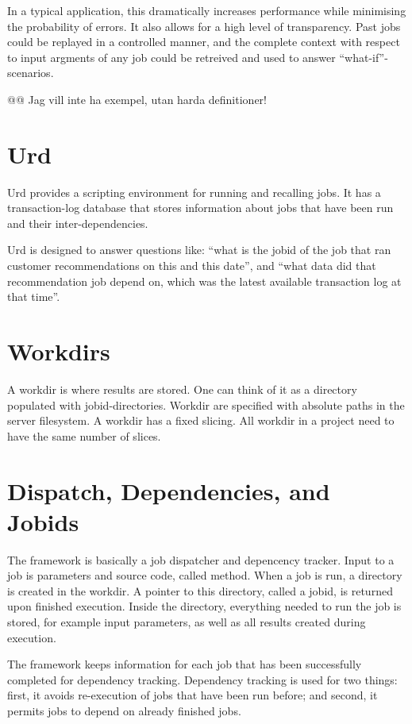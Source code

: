 In a typical application, this dramatically increases performance
while minimising the probability of errors.  It also allows for a high
level of transparency.  Past jobs could be replayed in a controlled
manner, and the complete context with respect to input argments of any
job could be retreived and used to answer ``what-if''-scenarios.

@@ Jag vill inte ha exempel, utan harda definitioner!



\section{Urd}

Urd provides a scripting environment for running and recalling jobs.
It has a transaction-log database that stores information about jobs
that have been run and their inter-dependencies.

Urd is designed to answer questions like: ``what is the jobid of the
job that ran customer recommendations on this and this date'', and
``what data did that recommendation job depend on, which was the
latest available transaction log at that time''.




\section{Workdirs}

A workdir is where results are stored.  One can think of it as a
directory populated with jobid-directories.  Workdir are specified
with absolute paths in the server filesystem.  A workdir has a fixed
slicing.  All workdir in a project need to have the same number of
slices.



\section{Dispatch, Dependencies, and Jobids}

The framework is basically a job dispatcher and depencency tracker.
Input to a job is parameters and source code, called method.  When a
job is run, a directory is created in the workdir.  A pointer to this
directory, called a jobid, is returned upon finished execution.
Inside the directory, everything needed to run the job is stored, for
example input parameters, as well as all results created during
execution.

The framework keeps information for each job that has been
successfully completed for dependency tracking.  Dependency tracking
is used for two things: first, it avoids re-execution of jobs that
have been run before; and second, it permits jobs to depend on already
finished jobs.

